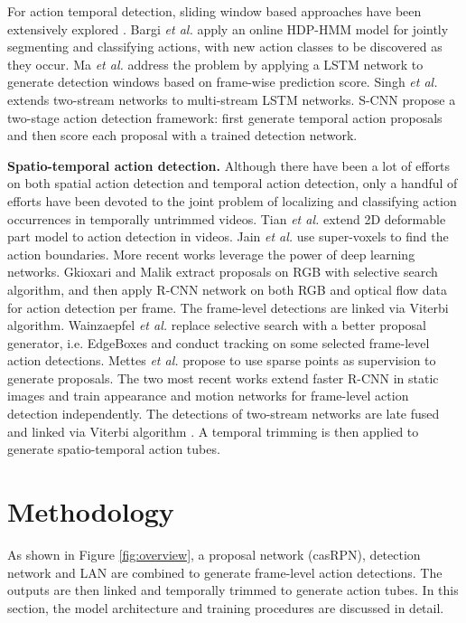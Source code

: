 \documentclass{bmvc2k}
\begin{document}
For action temporal detection, sliding window based approaches have been extensively explored \cite{gaidon2013temporal,tian2013spatiotemporal,wang2014video}. Bargi \textit{et al.} \cite{bargi2012online} apply an online HDP-HMM model for jointly segmenting and classifying actions, with new action classes to be discovered as they occur. Ma \textit{et al.} \cite{ma2016learning} address the problem by applying a LSTM network to generate detection windows based on frame-wise prediction score. Singh \textit{et al.} \cite{singh2016multi} extends two-stream networks to multi-stream LSTM networks. S-CNN \cite{scnn_shou_wang_chang_cvpr16} propose a two-stage action detection framework: first generate temporal action proposals and then score each proposal with a trained detection network.

\textbf{Spatio-temporal action detection.} Although there have been a lot of efforts on both spatial action detection and temporal action detection, only a handful of efforts have been devoted to the joint problem of localizing and classifying action occurrences in temporally untrimmed videos. Tian \textit{et al.} \cite{tian2013spatiotemporal} extend 2D deformable part model \cite{felzenszwalb2008discriminatively} to action detection in videos. Jain \textit{et al.} \cite{jain2014action} use super-voxels to find the action boundaries. More recent works leverage the power of deep learning networks. Gkioxari and Malik \cite{gkioxari2015finding} extract proposals on RGB with selective search algorithm, and then apply R-CNN network on both RGB and optical flow data for action detection per frame. The frame-level detections are linked via Viterbi algorithm. Wainzaepfel \textit{et al.} \cite{weinzaepfel2015learning} replace selective search with a better proposal generator, i.e. EdgeBoxes \cite{zitnick2014edge} and conduct tracking on some selected frame-level action detections. Mettes \textit{et al.} \cite{mettes2016spot} propose to use sparse points as supervision to generate proposals. The two most recent works \cite{suman16bmvc,peng2016multi} extend faster R-CNN in static images and train appearance and motion networks for frame-level action detection independently. The detections of two-stream networks are late fused and linked via Viterbi algorithm \cite{forney1973viterbi}. A temporal trimming is then applied to generate spatio-temporal action tubes.

\section{Methodology}
\label{methodology}
As shown in Figure \ref{fig:overview}, a proposal network (casRPN), detection network and LAN are combined to generate frame-level action detections. The outputs are then linked and temporally trimmed to generate action tubes. In this section, the model architecture and training procedures are discussed in detail.
\end{document}
